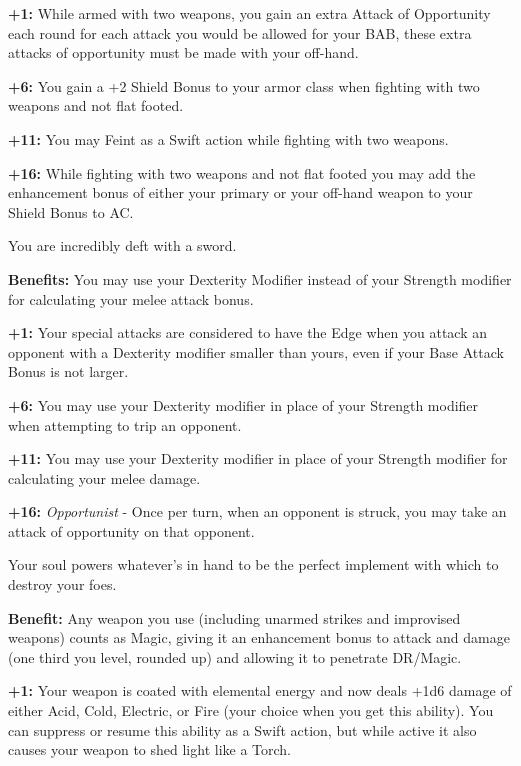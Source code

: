 \textbf{+1:} While armed with two weapons, you gain an extra Attack of Opportunity each round for each attack you would be allowed for your BAB, these extra attacks of opportunity must be made with your off-hand.

\textbf{+6:} You gain a +2 Shield Bonus to your armor class when fighting with two weapons and not flat footed.

\textbf{+11:} You may Feint as a Swift action while fighting with two weapons.

\textbf{+16:} While fighting with two weapons and not flat footed you may add the enhancement bonus of either your primary or your off-hand weapon to your Shield Bonus to AC.


You are incredibly deft with a sword.

\textbf{Benefits:} You may use your Dexterity Modifier instead of your Strength modifier for calculating your melee attack bonus.

\textbf{+1:} Your special attacks are considered to have the Edge when you attack an opponent with a Dexterity modifier smaller than yours, even if your Base Attack Bonus is not larger.

\textbf{+6:} You may use your Dexterity modifier in place of your Strength modifier when attempting to trip an opponent.

\textbf{+11:} You may use your Dexterity modifier in place of your Strength modifier for calculating your melee damage.

\textbf{+16:} \textit{Opportunist} - Once per turn, when an opponent is struck, you may take an attack of opportunity on that opponent.


Your soul powers whatever's in hand to be the perfect implement with which to destroy your foes.

\textbf{Benefit:} Any weapon you use (including unarmed strikes and improvised weapons) counts as Magic, giving it an enhancement bonus to attack and damage (one third you level, rounded up) and allowing it to penetrate DR/Magic.

\textbf{+1:} Your weapon is coated with elemental energy and now deals +1d6 damage of either Acid, Cold, Electric, or Fire (your choice when you get this ability). You can suppress or resume this ability as a Swift action, but while active it also causes your weapon to shed light like a Torch.

